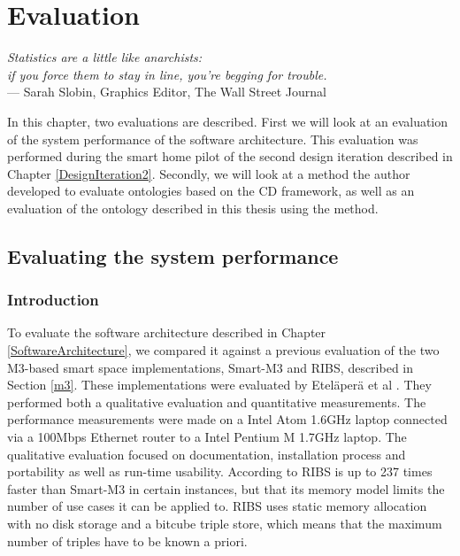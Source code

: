 \chapter{Evaluation}
\label{Evaluation}

\begin{flushright}{\slshape    
Statistics are a little like anarchists: \\
if you force them to stay in line, you're begging for trouble.} \\ \medskip
    --- Sarah Slobin, Graphics Editor, The Wall Street Journal
\end{flushright}


In this chapter, two evaluations are described. First we will look at an evaluation of the system performance of the software architecture. This evaluation was performed during the smart home pilot of the second design iteration described in Chapter \ref{DesignIteration2}. Secondly, we will look at a method the author developed to evaluate ontologies based on the \ac{CD} framework, as well as an evaluation of the ontology described in this thesis using the method.

\section{Evaluating the system performance}
\label{performance}
\subsection{Introduction}

To evaluate the software architecture described in Chapter \ref{SoftwareArchitecture}, we compared it against a previous evaluation of the two M3-based smart space implementations, Smart-M3 and \ac{RIBS}, described in Section \ref{m3}. These implementations were evaluated by Etel\"aper\"a et al \cite{Etelapera2011}. They performed both a qualitative evaluation and quantitative measurements. The performance measurements were made on a Intel Atom 1.6GHz laptop connected via a 100Mbps Ethernet router to a Intel Pentium M 1.7GHz laptop. The qualitative evaluation focused on documentation, installation process and portability as well as run-time usability. According to \cite{Etelapera2011} \ac{RIBS} is up to 237 times faster than Smart-M3 in certain instances, but that its memory model limits the number of use cases it can be applied to. \ac{RIBS} uses static memory allocation with no disk storage and a bitcube triple store, which means that the maximum number of triples have to be known a priori.

